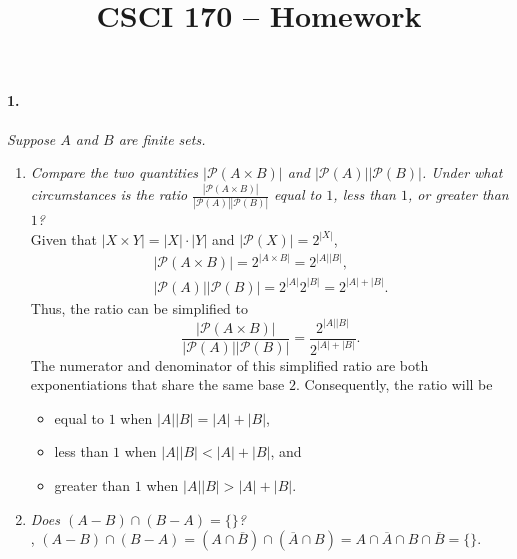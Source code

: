 \documentclass[12pt]{article}
\title{\vspace{-2\baselineskip}CSCI 170 -- Homework \homework}
\author{\name}
\date{\duedate}
\newcommand{\qa}{\\[0.5\baselineskip]}  %
\newcommand{\ps}{\mathcal{P}}
\begin{document}
\maketitle

\paragraph{1.}
\textit{Suppose $A$ and $B$ are finite sets.}
\begin{enumerate}[label=\textbf{\alph*.}]
    \item \textit{Compare the two quantities $|\ps(A \times B)|$ and $|\ps(A)| |\ps(B)|$.
    Under what circumstances is the ratio $\frac{|\ps(A \times B)|}{|\ps(A)| |\ps(B)|}$
    equal to $1$, less than $1$, or greater than $1$?} \qa
    Given that $|X \times Y| = |X| \cdot |Y|$ and $|\ps(X)| = 2^{|X|}$,
    \begin{gather*}
        |\ps(A \times B)| = 2^{|A \times B|} = 2^{|A| |B|}, \\
        |\ps(A)| |\ps(B)| = 2^{|A|} 2^{|B|} = 2^{|A| + |B|}.
    \end{gather*}
    Thus, the ratio can be simplified to
    \begin{equation*}
        \frac{|\ps(A \times B)|}{|\ps(A)| |\ps(B)|} = \frac{2^{|A| |B|}}{2^{|A| + |B|}}.
    \end{equation*}
    The numerator and denominator of this simplified ratio are both exponentiations that share the
    same base $2$. Consequently, the ratio will be
    \begin{itemize}
        \item equal to $1$ when $|A| |B| = |A| + |B|$,
        \item less than $1$ when $|A| |B| < |A| + |B|$, and
        \item greater than $1$ when $|A| |B| > |A| + |B|$.
    \end{itemize}
    \item \textit{Does $(A - B) \cap (B - A) = \{\}$?} \qa
    , $(A - B) \cap (B - A)
    = (A \cap \overline{B}) \cap (\overline{A} \cap B)
    = A \cap \overline{A} \cap B \cap \overline{B}
    = \{\}.$
\end{enumerate}
\end{document}
